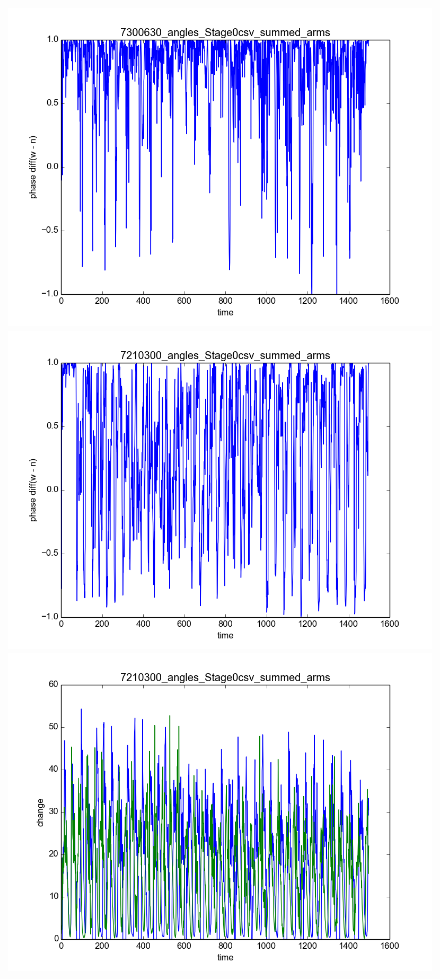 \documentclass[12pt]{article}
\begin{document}
\begin{figure}
  \centering
  \includegraphics[scale=0.4]{hilbert_1}
  \includegraphics[scale=0.4]{hilbert_2}
  \includegraphics[scale=0.4]{time_1}

\end{figure}
\end{document}
